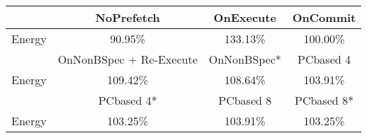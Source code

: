 \begin{tabular}{ l|ccc }
 & NoPrefetch & OnExecute & OnCommit\\ \hline
Energy
 & 90.95\% & 133.13\% & 100.00\%\\ \hline
\hline
 & OnNonBSpec + Re-Execute & OnNonBSpec* & PCbased 4\\ \hline
Energy
 & 109.42\% & 108.64\% & 103.91\%\\ \hline
\hline
 & PCbased 4* & PCbased 8 & PCbased 8*\\ \hline
Energy
 & 103.25\% & 103.91\% & 103.25\%\\ \hline
\end{tabular}


